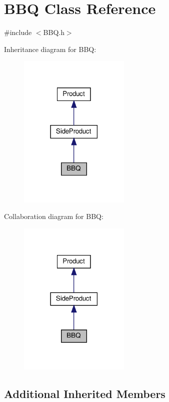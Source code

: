 \hypertarget{classBBQ}{}\section{B\+BQ Class Reference}
\label{classBBQ}


{\ttfamily \#include $<$B\+B\+Q.\+h$>$}



Inheritance diagram for B\+BQ\+:
\nopagebreak
\begin{figure}[H]
\begin{center}
\leavevmode
\includegraphics[width=150pt]{classBBQ__inherit__graph}
\end{center}
\end{figure}


Collaboration diagram for B\+BQ\+:
\nopagebreak
\begin{figure}[H]
\begin{center}
\leavevmode
\includegraphics[width=150pt]{classBBQ__coll__graph}
\end{center}
\end{figure}
\subsection*{Additional Inherited Members}


